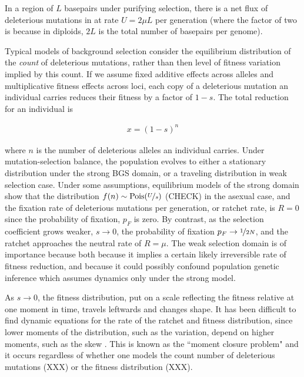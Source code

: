 \documentclass[11pt]{article}
\begin{document}
In a region of $L$ basepairs under purifying selection, there is a net flux of
deleterious mutations in at rate $U = 2 \mu L$ per generation (where the factor
of two is because in diploids, $2L$ is the total number of basepairs per genome). 

Typical models of background selection consider the equilibrium distribution of
the \emph{count} of deleterious mutations, rather than then level of fitness
variation implied by this count. If we assume fixed additive effects across
alleles and multiplicative fitness effects across loci, each copy of a
deleterious mutation an individual carries reduces their fitness by a factor of
$1-s$. The total reduction for an individual is

\begin{align}
  x = (1-s)^n
\end{align}

where $n$ is the number of deleterious alleles an individual carries. Under
mutation-selection balance, the population evolves to either a stationary
distribution under the strong BGS domain, or a traveling distribution in weak
selection case. Under some assumptions, equilibrium models of the strong domain
show that the distribution $f(n) \sim \text{Pois}(\nicefrac{U}{s})$
\parencite{Kimura1966-bk,Crow1970-wj} (CHECK) in the asexual case, and the
fixation rate of deleterious mutations per generation, or ratchet rate, is $R =
0$ since the probability of fixation, $p_F$ is zero. By contrast, as the
selection coefficient grows weaker, $s \to 0$, the probability of fixation $p_F
\to \nicefrac{1}{2N}$, and the ratchet approaches the neutral rate of $R =
\mu$. The weak selection domain is of importance because both because it
implies a certain likely irreversible rate of fitness reduction, and because it
could possibly confound population genetic inference which assumes dynamics
only under the strong model.

As $s \to 0$, the fitness distribution, put on a scale reflecting the fitness
relative at one moment in time, travels leftwards and changes shape. It has
been difficult to find dynamic equations for the rate of the ratchet and
fitness distribution, since lower moments of the distribution, such as the
variation, depend on higher moments, such as the skew
\parencite{Good2013-lp,Haigh1978-gt,Higgs1995-xc}. This is known as the ``moment
closure problem" and it occurs regardless of whether one models the count
number of deleterious mutations (XXX) or the fitness distribution (XXX).
\end{document}
